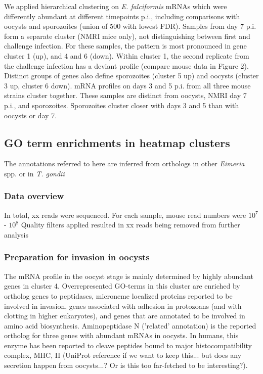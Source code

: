 \documentclass{bmcart}
\begin{document}
We applied hierarchical clustering on \textit{E. falciformis} mRNAs
which were differently abundant at different timepoints p.i.,
including comparisons with oocysts and sporozoites (union of 500 with
lowest FDR). Samples from day 7 p.i. form a separate cluster (NMRI
mice only), not distinguishing between first and challenge
infection. For these samples, the pattern is most pronounced in gene
cluster 1 (up), and 4 and 6 (down). Within cluster 1, the second
replicate from the challenge infection has a deviant profile (compare
mouse data in Figure 2). Distinct groups of genes also define
sporozoites (cluster 5 up) and oocysts (cluster 3 up, cluster 6
down). mRNA profiles on days 3 and 5 p.i. from all three mouse strains
cluster together. These samples are distinct from oocysts, NMRI day 7
p.i., and sporozoites. Sporozoites cluster closer with days 3 and 5
than with oocysts or day 7.



\subsection*{GO term enrichments in heatmap clusters}
The annotations referred to here are inferred from orthologs in other \textit{Eimeria} spp. or
in \textit{T. gondii}

\subsubsection*{Data overview}
In total, xx reads were sequenced. For each sample, mouse read numbers were $10^7$ - $10^8$
Quality filters applied resulted in xx reads being removed from further analysis

\subsubsection*{Preparation for invasion in oocysts}
The mRNA profile in the oocyst stage is mainly determined by highly
abundant genes in cluster 4.  Overrepresented GO-terms in this cluster
are enriched by ortholog genes to peptidases, microneme localized
proteins reported to be involved in invasion, genes associated with
adhesion in protozoans (and with clotting in higher eukaryotes), and
genes that are annotated to be involved in amino acid biosynthesis.
Aminopeptidase N ('related' annotation) is the reported ortholog for
three genes with abundant mRNAs in oocysts. In humans, this enzyme has
been reported to cleave peptides bound to major histocompatibility
complex, MHC, II (UniProt reference if we want to keep this... but
does any secretion happen from oocysts...? Or is this too far-fetched
to be interesting?).
\end{document}
